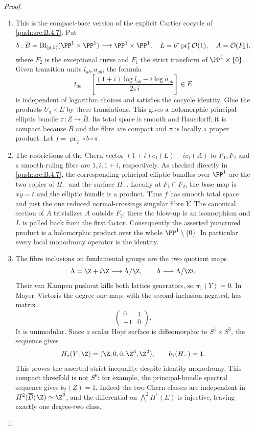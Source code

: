 \begin{proof}
\begin{enumerate}[label=\arabic*.,leftmargin=*]
\item This is the compact-base version of the explicit Cartier cocycle
of \ref{push:src:B.4.7}.
Put
\[
 b:\overline B=\operatorname{Bl}_{(p,0)}(\PP^1\times\PP^1)
      \longrightarrow\PP^1\times\PP^1,
 \quad L=b^*\operatorname{pr}_1^*\mathcal O(1),
 \quad A=\mathcal O(F_2),
\]
where $F_2$ is the exceptional curve and $F_1$ the strict transform
of $\PP^1\times\{0\}$.  Given transition units $l_{ab},a_{ab}$,
the formula
\[
 t_{ab}=\left[
 \frac{(1+i)\log l_{ab}-i\log a_{ab}}{2\pi i}
 \right]\in E
\]
is independent of logarithm choices and satisfies the cocycle
identity.  Glue the products $U_a\times E$ by these translations.
This gives a holomorphic principal elliptic bundle
$\pi:Z\to\overline B$.  Its total space is smooth and Hausdorff;
it is compact because $\overline B$ and the fibre are compact and
$\pi$ is locally a proper product.  Let
$f=\operatorname{pr}_2\circ b\circ\pi$.

\item The restrictions of the Chern vector
$(1+i)c_1(L)-i c_1(A)$ to $F_1,F_2$ and a smooth ruling fibre
are $1,i,1+i$, respectively.  As checked directly in \ref{push:src:B.4.7},
the corresponding principal elliptic bundles over $\PP^1$
are the two copies of $H_+$ and the surface $H_-$.  Locally
at $F_1\cap F_2$, the base map is $xy=t$ and the elliptic
bundle is a product.  Thus $f$ has smooth total space and just
the one reduced normal-crossings singular fibre $Y$.
The canonical section of $A$ trivializes $A$ outside $F_2$;
there the blow-up is an isomorphism and $L$ is pulled back
from the first factor.  Consequently the asserted punctured
product is a holomorphic product over the whole
$\PP^1\setminus\{0\}$.  In particular every local monodromy
operator is the identity.

\item The fibre inclusions on fundamental groups
are the two quotient maps
\[
 \Lambda=\Z+i\Z\longrightarrow\Lambda/\Z,
 \qquad
 \Lambda\longrightarrow\Lambda/\Z i.
\]
Their van Kampen pushout kills both lattice generators, so
$\pi_1(Y)=0$.  In Mayer--Vietoris the degree-one map, with
the second inclusion negated, has matrix
\[
 \begin{pmatrix}0&1\\-1&0\end{pmatrix}.
\]
It is unimodular.  Since a scalar Hopf surface is diffeomorphic
to $S^1\times S^3$, the sequence gives
\[
 H_*(Y;\Z)=(\Z,0,0,\Z^3,\Z^2),\qquad b_1(H_-)=1.
\]
This proves the asserted strict inequality despite identity
monodromy.  This compact threefold is not $S^6$: for example,
the principal-bundle spectral sequence gives $b_2(Z)=1$.
Indeed the two Chern classes are independent in
$H^2(\overline B;\Z)\simeq\Z^3$, and the differential on
$\bigwedge^2H^1(E)$ is injective, leaving exactly one
degree-two class.
\end{enumerate}
\end{proof}
